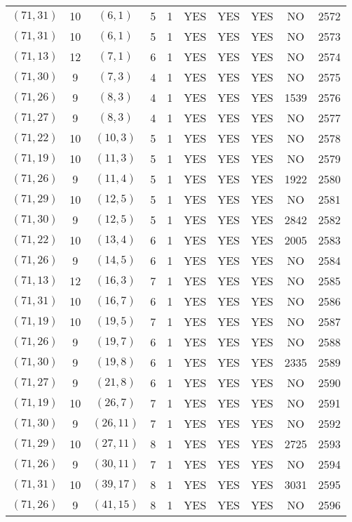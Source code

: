 \begin{longtable}{|c|c|c|c|c|c|c|c|c|c|}
$(71, 31)$ & 10 & $(6, 1)$ & 5 & 1 & YES & YES & YES & NO & 2572\\
$(71, 31)$ & 10 & $(6, 1)$ & 5 & 1 & YES & YES & YES & NO & 2573\\
$(71, 13)$ & 12 & $(7, 1)$ & 6 & 1 & YES & YES & YES & NO & 2574\\
$(71, 30)$ & 9 & $(7, 3)$ & 4 & 1 & YES & YES & YES & NO & 2575\\
$(71, 26)$ & 9 & $(8, 3)$ & 4 & 1 & YES & YES & YES & 1539 & 2576\\
$(71, 27)$ & 9 & $(8, 3)$ & 4 & 1 & YES & YES & YES & NO & 2577\\
$(71, 22)$ & 10 & $(10, 3)$ & 5 & 1 & YES & YES & YES & NO & 2578\\
$(71, 19)$ & 10 & $(11, 3)$ & 5 & 1 & YES & YES & YES & NO & 2579\\
$(71, 26)$ & 9 & $(11, 4)$ & 5 & 1 & YES & YES & YES & 1922 & 2580\\
$(71, 29)$ & 10 & $(12, 5)$ & 5 & 1 & YES & YES & YES & NO & 2581\\
$(71, 30)$ & 9 & $(12, 5)$ & 5 & 1 & YES & YES & YES & 2842 & 2582\\
$(71, 22)$ & 10 & $(13, 4)$ & 6 & 1 & YES & YES & YES & 2005 & 2583\\
$(71, 26)$ & 9 & $(14, 5)$ & 6 & 1 & YES & YES & YES & NO & 2584\\
$(71, 13)$ & 12 & $(16, 3)$ & 7 & 1 & YES & YES & YES & NO & 2585\\
$(71, 31)$ & 10 & $(16, 7)$ & 6 & 1 & YES & YES & YES & NO & 2586\\
$(71, 19)$ & 10 & $(19, 5)$ & 7 & 1 & YES & YES & YES & NO & 2587\\
$(71, 26)$ & 9 & $(19, 7)$ & 6 & 1 & YES & YES & YES & NO & 2588\\
$(71, 30)$ & 9 & $(19, 8)$ & 6 & 1 & YES & YES & YES & 2335 & 2589\\
$(71, 27)$ & 9 & $(21, 8)$ & 6 & 1 & YES & YES & YES & NO & 2590\\
$(71, 19)$ & 10 & $(26, 7)$ & 7 & 1 & YES & YES & YES & NO & 2591\\
$(71, 30)$ & 9 & $(26, 11)$ & 7 & 1 & YES & YES & YES & NO & 2592\\
$(71, 29)$ & 10 & $(27, 11)$ & 8 & 1 & YES & YES & YES & 2725 & 2593\\
$(71, 26)$ & 9 & $(30, 11)$ & 7 & 1 & YES & YES & YES & NO & 2594\\
$(71, 31)$ & 10 & $(39, 17)$ & 8 & 1 & YES & YES & YES & 3031 & 2595\\
$(71, 26)$ & 9 & $(41, 15)$ & 8 & 1 & YES & YES & YES & NO & 2596\\

\end{longtable}
